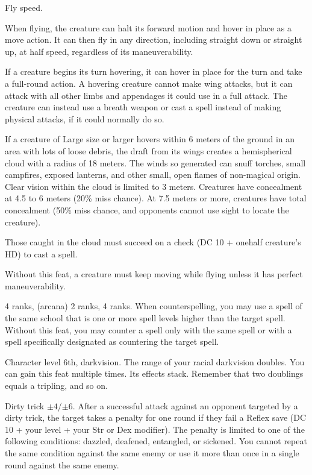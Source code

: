 {}
{Fly speed.}
{When flying, the creature can halt its forward motion and hover in place as a move action. It can then fly in any direction, including straight down or straight up, at half speed, regardless of its maneuverability.

If a creature begins its turn hovering, it can hover in place for the turn and take a full-round action. A hovering creature cannot make wing attacks, but it can attack with all other limbs and appendages it could use in a full attack. The creature can instead use a breath weapon or cast a spell instead of making physical attacks, if it could normally do so.

If a creature of Large size or larger hovers within 6 meters of the ground in an area with lots of loose debris, the draft from its wings creates a hemispherical cloud with a radius of 18 meters. The winds so generated can snuff torches, small campfires, exposed lanterns, and other small, open flames of non-magical origin. Clear vision within the cloud is limited to 3 meters. Creatures have concealment at 4.5 to 6 meters (20\% miss chance). At 7.5 meters or more, creatures have total concealment (50\% miss chance, and opponents cannot use sight to locate the creature).

Those caught in the cloud must succeed on a  check (DC 10 + onehalf creature's HD) to cast a spell.}
{Without this feat, a creature must keep moving while flying unless it has perfect maneuverability.}
{}

{}
{ 4 ranks,  (arcana) 2 ranks,  4 ranks.}
{When counterspelling, you may use a spell of the same school that is one or more spell levels higher than the target spell.}
{Without this feat, you may counter a spell only with the same spell or with a spell specifically designated as countering the target spell.}{}

{}{Character level 6th, darkvision.}
{The range of your racial darkvision doubles.}
{}{You can gain this feat multiple times. Its effects stack. Remember that two doublings equals a tripling, and so on.}

{Dirty trick $\pm4$/$\pm6$.}
{After a successful attack against an opponent targeted by a dirty trick, the target takes a penalty for one round if they fail a Reflex save (DC 10 + \onehalf your level + your Str or Dex modifier). The penalty is limited to one of the following conditions: dazzled, deafened, entangled, or sickened. You cannot repeat the same condition against the same enemy or use it more than once in a single round against the same enemy.}


